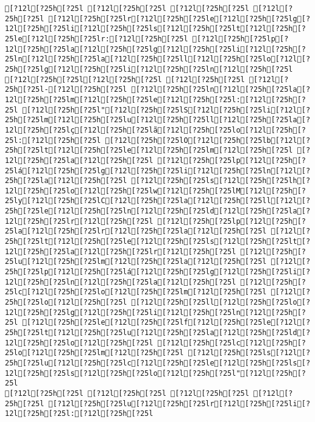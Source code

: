 \documentclass{scrartcl}
\begin{document}
\begin{Verbatim}
[?12l[?25h[?25l [?12l[?25h[?25l [?12l[?25h[?25l [?12l[?25h[?25l [?12l[?25h[?25lr[?12l[?25h[?25le[?12l[?25h[?25lg[?12l[?25h[?25li[?12l[?25h[?25ls[?12l[?25h[?25lt[?12l[?25h[?25le[?12l[?25h[?25lr:[?12l[?25h[?25l [?12l[?25h[?25lp[?12l[?25h[?25la[?12l[?25h[?25lg[?12l[?25h[?25li[?12l[?25h[?25ln[?12l[?25h[?25la[?12l[?25h[?25ll[?12l[?25h[?25lo[?12l[?25h[?25lg[?12l[?25h[?25li[?12l[?25h[?25ln[?12l[?25h[?25l
[?12l[?25h[?25l[?12l[?25h[?25l [?12l[?25h[?25l [?12l[?25h[?25l-[?12l[?25h[?25l [?12l[?25h[?25ln[?12l[?25h[?25la[?12l[?25h[?25lm[?12l[?25h[?25le[?12l[?25h[?25l:[?12l[?25h[?25l [?12l[?25h[?25l"[?12l[?25h[?25lS[?12l[?25h[?25li[?12l[?25h[?25lm[?12l[?25h[?25lu[?12l[?25h[?25ll[?12l[?25h[?25la[?12l[?25h[?25lç[?12l[?25h[?25lã[?12l[?25h[?25lo[?12l[?25h[?25l:[?12l[?25h[?25l [?12l[?25h[?25lO[?12l[?25h[?25lb[?12l[?25h[?25lt[?12l[?25h[?25le[?12l[?25h[?25lm[?12l[?25h[?25l [?12l[?25h[?25la[?12l[?25h[?25l [?12l[?25h[?25lp[?12l[?25h[?25lá[?12l[?25h[?25lg[?12l[?25h[?25li[?12l[?25h[?25ln[?12l[?25h[?25la[?12l[?25h[?25l [?12l[?25h[?25ls[?12l[?25h[?25lh[?12l[?25h[?25lo[?12l[?25h[?25lw[?12l[?25h[?25lM[?12l[?25h[?25ly[?12l[?25h[?25lC[?12l[?25h[?25la[?12l[?25h[?25ll[?12l[?25h[?25le[?12l[?25h[?25ln[?12l[?25h[?25ld[?12l[?25h[?25la[?12l[?25h[?25lr[?12l[?25h[?25l [?12l[?25h[?25lp[?12l[?25h[?25la[?12l[?25h[?25lr[?12l[?25h[?25la[?12l[?25h[?25l [?12l[?25h[?25lt[?12l[?25h[?25le[?12l[?25h[?25ls[?12l[?25h[?25lt[?12l[?25h[?25la[?12l[?25h[?25lr[?12l[?25h[?25l [?12l[?25h[?25lu[?12l[?25h[?25lm[?12l[?25h[?25la[?12l[?25h[?25l [?12l[?25h[?25lp[?12l[?25h[?25lá[?12l[?25h[?25lg[?12l[?25h[?25li[?12l[?25h[?25ln[?12l[?25h[?25la[?12l[?25h[?25l [?12l[?25h[?25lc[?12l[?25h[?25lo[?12l[?25h[?25lm[?12l[?25h[?25l [?12l[?25h[?25lo[?12l[?25h[?25l [?12l[?25h[?25ll[?12l[?25h[?25lo[?12l[?25h[?25lg[?12l[?25h[?25li[?12l[?25h[?25ln[?12l[?25h[?25l [?12l[?25h[?25le[?12l[?25h[?25lf[?12l[?25h[?25le[?12l[?25h[?25lt[?12l[?25h[?25lu[?12l[?25h[?25la[?12l[?25h[?25ld[?12l[?25h[?25lo[?12l[?25h[?25l [?12l[?25h[?25lc[?12l[?25h[?25lo[?12l[?25h[?25lm[?12l[?25h[?25l [?12l[?25h[?25ls[?12l[?25h[?25lu[?12l[?25h[?25lc[?12l[?25h[?25le[?12l[?25h[?25ls[?12l[?25h[?25ls[?12l[?25h[?25lo[?12l[?25h[?25l"[?12l[?25h[?25l
[?12l[?25h[?25l [?12l[?25h[?25l [?12l[?25h[?25l [?12l[?25h[?25l [?12l[?25h[?25lu[?12l[?25h[?25lr[?12l[?25h[?25li[?12l[?25h[?25l:[?12l[?25h[?25l

\end{Verbatim}
\end{document}
